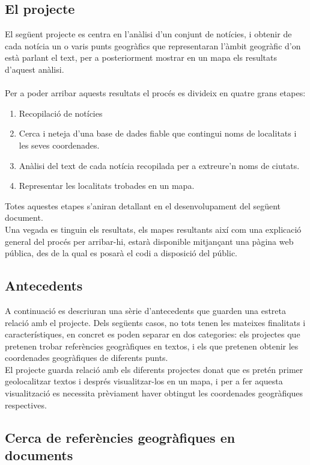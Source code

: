 \documentclass[12pt,a4paper,openright,oneside]{article}
\numberwithin{equation}{section}
\theoremstyle{definition}
\begin{document}
\subsection{El projecte}

El següent projecte es centra en l'anàlisi d'un conjunt de notícies, i obtenir de cada notícia un o varis punts geogràfics que representaran l'àmbit geogràfic d'on està parlant el text, per a posteriorment mostrar en un mapa els resultats d'aquest anàlisi.\\ \\
Per a poder arribar aquests resultats el procés es divideix en quatre grans etapes:
\begin{enumerate}
\item Recopilació de notícies
\item Cerca i neteja d'una base de dades fiable que contingui noms de localitats i les seves coordenades.
\item Anàlisi del text de cada notícia recopilada per a extreure'n noms de ciutats.
\item Representar les localitats trobades en un mapa.
\end{enumerate}

Totes aquestes etapes s'aniran detallant en el desenvolupament del següent document.\\
Una vegada es tinguin els resultats, els mapes resultants així com una explicació general del procés per arribar-hi, estarà disponible mitjançant una pàgina web pública, des de la qual es posarà el codi a disposició del públic.

\subsection{Antecedents}
A continuació es descriuran una sèrie d'antecedents que guarden una estreta relació amb el projecte. Dels següents casos, no tots tenen les mateixes finalitats i característiques, en concret es poden separar en dos categories: els projectes que pretenen trobar referències geogràfiques en textos, i els que pretenen obtenir les coordenades geogràfiques de diferents punts.\\
El projecte guarda relació amb els diferents projectes donat que es pretén primer geolocalitzar textos i després visualitzar-los en un mapa, i per a fer aquesta visualització es necessita prèviament haver obtingut les coordenades geogràfiques respectives.
\subsection*{Cerca de referències geogràfiques en documents}
\end{document}
